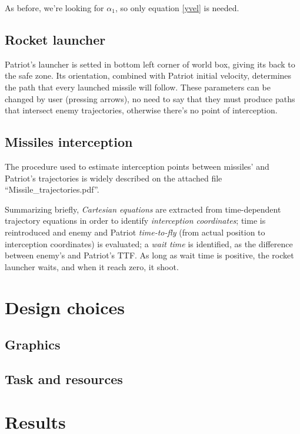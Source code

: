 \documentclass[notitlepage,a4paper,11pt]{article} %
\begin{document}
			As before, we're looking for $\alpha_1$, so only equation \eqref{yvel} is needed.

	\subsection{Rocket launcher}
		Patriot's launcher is setted in bottom left corner of world box, giving its back to the safe zone.
		Its orientation, combined with Patriot initial velocity, determines the path that every launched missile 
		 will follow.
		These parameters can be changed by user (pressing arrows), no need to say that they must produce paths that intersect enemy trajectories, otherwise there's no point of interception.

	\subsection{Missiles interception}

		The procedure used to estimate interception points between missiles' and Patriot's trajectories is widely described on the attached file \mbox{``Missile\_trajectories.pdf''}.

		Summarizing briefly, \emph{Cartesian equations} are extracted from time-dependent trajectory equations in order to identify \emph{interception coordinates}; time is reintroduced and enemy and Patriot \emph{time-to-fly} (from actual position to interception coordinates) is evaluated; a \emph{wait time} is identified, as the difference between enemy's and Patriot's TTF. As long as wait time is positive, the rocket launcher waits, and when it reach zero, it shoot.

\section{Design choices}
	\subsection{Graphics}
	\subsection{Task and resources}
\section{Results}

\hypersetup{linkcolor=black}
\listoffigures %
\hypersetup{linkcolor=blue}
\end{document}

